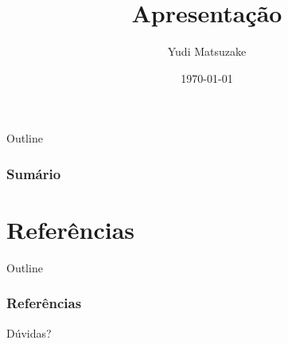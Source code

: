\documentclass{beamer}
\title[Apresentação]{Apresentação} %
\author[Yudi]{
Yudi Matsuzake\\
} %
\institute[UTFPR] %
{
Universidade Tecnológica Federal do Paraná\\ %
\medskip
\textit{matsuzake@alunos.utfpr.edu.br} \\ %
\medskip
\url{https://github.com/yudi-matsuzake/} 
}
\date{\today} %
\begin{document}
\begin{frame}
\titlepage %
\end{frame}

\newcommand{\sumario}{
\begin{frame}[allowframebreaks]{Outline}
\frametitle{Sumário} %
\tableofcontents %
\end{frame}
}

\sumario





\section{Referências}

\begin{frame}[allowframebreaks]{Outline}
\frametitle{Referências}

\end{frame}


\begin{frame}
\centerline{Dúvidas?}
\titlepage
\end{frame}

\end{document}
